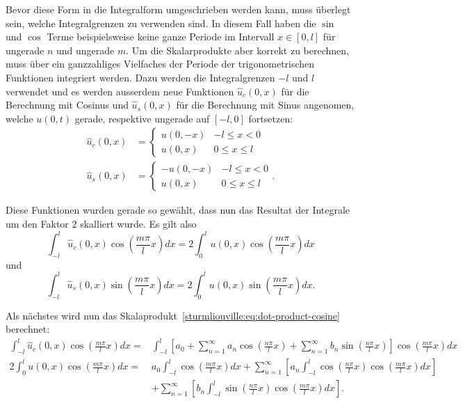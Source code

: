 Bevor diese Form in die Integralform umgeschrieben werden kann, muss überlegt
sein, welche Integralgrenzen zu verwenden sind.
In diesem Fall haben die $\sin$ und $\cos$ Terme beispielsweise keine ganze
Periode im Intervall $x \in [0, l]$ für ungerade $n$ und ungerade $m$.
Um die Skalarprodukte aber korrekt zu berechnen, muss über ein ganzzahliges
Vielfaches der Periode der trigonometrischen Funktionen integriert werden.
Dazu werden die Integralgrenzen $-l$ und $l$ verwendet und es werden ausserdem
neue Funktionen $\hat{u}_c(0, x)$ für die Berechnung mit Cosinus und
$\hat{u}_s(0, x)$ für die Berechnung mit Sinus angenomen, welche $u(0, t)$
gerade, respektive ungerade auf $[-l, 0]$ fortsetzen:
\[
\begin{aligned}
    \hat{u}_c(0, x)
    &=
    \begin{cases}
        u(0, -x) & -l \leq x < 0
        \\
        u(0, x) & 0 \leq x \leq l
    \end{cases}
    \\
    \hat{u}_s(0, x)
    &=
    \begin{cases}
        -u(0, -x) & -l \leq x < 0
        \\
        u(0, x) & 0 \leq x \leq l
    \end{cases}.
\end{aligned}
\]

Diese Funktionen wurden gerade so gewählt, dass nun das Resultat der Integrale
um den Faktor $2$ skalliert wurde.
Es gilt also
\[
    \int_{-l}^{l}\hat{u}_c(0, x)\cos\left(\frac{m \pi}{l}x\right)dx
    =
    2\int_{0}^{l}u(0, x)\cos\left(\frac{m \pi}{l}x\right)dx
\]
und
\[
    \int_{-l}^{l}\hat{u}_s(0, x)\sin\left(\frac{m \pi}{l}x\right)dx
    =
    2\int_{0}^{l}u(0, x)\sin\left(\frac{m \pi}{l}x\right)dx.
\]

Als nächstes wird nun das
Skalaprodukt~\eqref{sturmliouville:eq:dot-product-cosine} berechnet:
\[
\begin{aligned}
    \int_{-l}^{l}\hat{u}_c(0, x)\cos\left(\frac{m \pi}{l}x\right)dx
    =&
    \int_{-l}^{l} \left[a_0
    +
    \sum_{n = 1}^{\infty} a_n\cos\left(\frac{n\pi}{l}x\right)
    +
    \sum_{n = 1}^{\infty} b_n\sin\left(\frac{n\pi}{l}x\right)\right]
    \cos\left(\frac{m \pi}{l}x\right) dx
    \\
    2\int_{0}^{l}u(0, x)\cos\left(\frac{m \pi}{l}x\right)dx
    =&
    a_0 \int_{-l}^{l}\cos\left(\frac{m \pi}{l}x\right) dx
    +
    \sum_{n = 1}^{\infty}\left[a_n\int_{-l}^{l}\cos\left(\frac{n\pi}{l}x\right)
        \cos\left(\frac{m \pi}{l}x\right)dx\right]
    \\
    &+
    \sum_{n = 1}^{\infty}\left[b_n\int_{-l}^{l}\sin\left(\frac{n\pi}{l}x\right)
        \cos\left(\frac{m \pi}{l}x\right)dx\right].
\end{aligned}
\]

